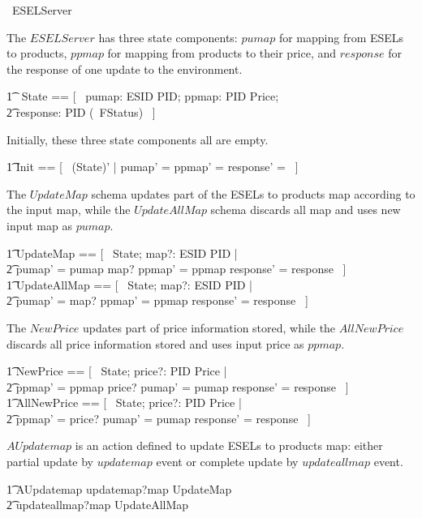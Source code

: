 \begin{circus}
	\circprocess\ ESELServer \circdef \circbegin \\
\end{circus}

The $ESELServer$ has three state components: $pumap$ for mapping from ESELs to products, $ppmap$ for mapping from products to their price, and $response$ for the response of one update to the environment.
\begin{circusaction}
    	\t1 \circstate\ State == [~ pumap: ESID \pfun PID; ppmap: PID \pfun Price; \\
            \t2 response: PID \pfun (\power~FStatus) ~]
\end{circusaction}
Initially, these three state components all are empty.
\begin{zed}
    	\t1	Init == [~ (State)' | pumap' = \emptyset \land ppmap' = \emptyset \land response' = \emptyset ~]
\end{zed}
The $UpdateMap$ schema updates part of the ESELs to products map according to the input map, while the $UpdateAllMap$ schema discards all map and uses new input map as $pumap$. 
\begin{zed}
        \t1 UpdateMap == [~ \Delta State; map?: ESID \pfun PID | \\
            \t2 pumap' = pumap \oplus map? \land ppmap' = ppmap \land response' = response ~] \\
        \t1 UpdateAllMap == [~ \Delta State; map?: ESID \pfun PID | \\
            \t2 pumap' = map? \land ppmap' = ppmap \land response' = response ~] 
\end{zed}
The $NewPrice$ updates part of price information stored, while the $AllNewPrice$ discards all price information stored and uses input price as $ppmap$. 
\begin{zed}
        \t1 NewPrice == [~ \Delta State; price?: PID \pfun Price | \\
            \t2 ppmap' = ppmap \oplus price? \land pumap' = pumap \land response' = response ~] \\
        \t1 AllNewPrice == [~ \Delta State; price?: PID \pfun Price | \\
            \t2 ppmap' = price? \land pumap' = pumap \land response' = response ~]
\end{zed}
$AUpdatemap$ is an action defined to update ESELs to products map: either partial update by $updatemap$ event or complete update by $updateallmap$ event.
\begin{circusaction}
        \t1 AUpdatemap \circdef updatemap?map \then \lschexpract UpdateMap \rschexpract \\
            \t2 \extchoice updateallmap?map \then \lschexpract UpdateAllMap \rschexpract \\
\end{circusaction}
